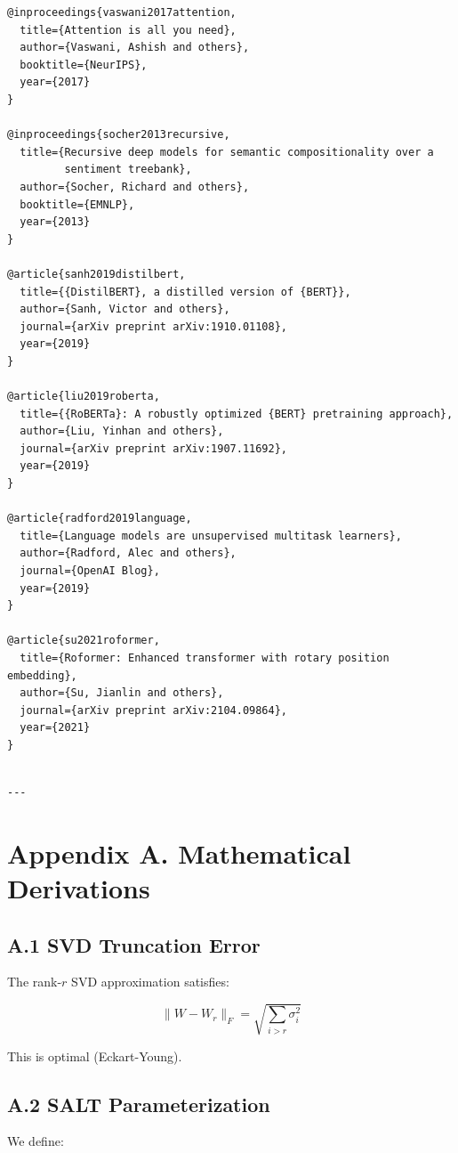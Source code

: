 \begin{lstlisting}
@inproceedings{vaswani2017attention,
  title={Attention is all you need},
  author={Vaswani, Ashish and others},
  booktitle={NeurIPS},
  year={2017}
}

@inproceedings{socher2013recursive,
  title={Recursive deep models for semantic compositionality over a 
         sentiment treebank},
  author={Socher, Richard and others},
  booktitle={EMNLP},
  year={2013}
}

@article{sanh2019distilbert,
  title={{DistilBERT}, a distilled version of {BERT}},
  author={Sanh, Victor and others},
  journal={arXiv preprint arXiv:1910.01108},
  year={2019}
}

@article{liu2019roberta,
  title={{RoBERTa}: A robustly optimized {BERT} pretraining approach},
  author={Liu, Yinhan and others},
  journal={arXiv preprint arXiv:1907.11692},
  year={2019}
}

@article{radford2019language,
  title={Language models are unsupervised multitask learners},
  author={Radford, Alec and others},
  journal={OpenAI Blog},
  year={2019}
}

@article{su2021roformer,
  title={Roformer: Enhanced transformer with rotary position embedding},
  author={Su, Jianlin and others},
  journal={arXiv preprint arXiv:2104.09864},
  year={2021}
}
\end{lstlisting}
\begin{lstlisting}

---
\end{lstlisting}


\section{Appendix A. Mathematical Derivations}

\subsection{A.1 SVD Truncation Error}

The rank-$r$ SVD approximation satisfies:

\[
\|W - W_r\|_F = \sqrt{\sum_{i > r} \sigma_i^2}
\tag{A.1}
\]

This is optimal (Eckart-Young).

\subsection{A.2 SALT Parameterization}

We define:


